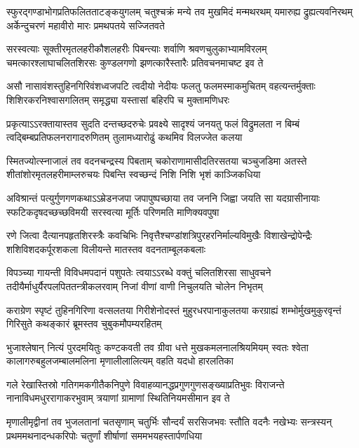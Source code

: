 \fourlineindentedshloka
{स्फुरद्गण्डाभोगप्रतिफलितताटङ्कयुगलम्}
{चतुश्चक्रं मन्ये तव मुखमिदं मन्मथरथम्}
{यमारुह्य द्रुह्यत्यवनिरथम् अर्केन्दुचरणं}
{महावीरो मारः प्रमथपतये सज्जितवते}%

\fourlineindentedshloka
{सरस्वत्याः सूक्तीरमृतलहरीकौशलहरीः}
{पिबन्त्याः शर्वाणि श्रवणचुलुकाभ्यामविरलम्}
{चमत्कारश्लाघाचलितशिरसः कुण्डलगणो}
{झणत्कारैस्तारैः प्रतिवचनमाचष्ट इव ते}%

\fourlineindentedshloka
{असौ नासावंशस्तुहिनगिरिवंशध्वजपटि}
{त्वदीयो नेदीयः फलतु फलमस्माकमुचितम्}
{वहत्यन्तर्मुक्ताः शिशिरकरनिश्वासगलितम्}
{समृद्ध्या यस्तासां बहिरपि च मुक्तामणिधरः}%

\fourlineindentedshloka
{प्रकृत्याऽऽरक्तायास्तव सुदति दन्तच्छदरुचेः}
{प्रवक्ष्ये सादृश्यं जनयतु फलं विद्रुमलता}
{न बिम्बं त्वद्बिम्बप्रतिफलनरागादरुणितम्}
{तुलामध्यारोढुं कथमिव विलज्जेत कलया}%

\fourlineindentedshloka
{स्मितज्योत्स्नाजालं तव वदनचन्द्रस्य पिबताम्}
{चकोराणामासीदतिरसतया चञ्चुजडिमा}
{अतस्ते शीतांशोरमृतलहरीमाम्लरुचयः}
{पिबन्ति स्वच्छन्दं निशि निशि भृशं काञ्जिकधिया}%

\fourlineindentedshloka
{अविश्रान्तं पत्युर्गुणगणकथाऽऽम्रेडनजपा}
{जपापुष्पच्छाया तव जननि जिह्वा जयति सा}
{यदग्रासीनायाः स्फटिकदृषदच्छच्छविमयी}
{सरस्वत्या मूर्तिः परिणमति माणिक्यवपुषा}%

\fourlineindentedshloka
{रणे जित्वा दैत्यानपहृतशिरस्त्रैः कवचिभिः}
{निवृत्तैश्चण्डांशत्रिपुरहरनिर्माल्यविमुखैः}
{विशाखेन्द्रोपेन्द्रैः शशिविशदकर्पूरशकला}
{विलीयन्ते मातस्तव वदनताम्बूलकबलाः}%

\fourlineindentedshloka
{विपञ्च्या गायन्ती विविधमपदानं पशुपतेः}
{त्वयाऽऽरब्धे वक्तुं चलितशिरसा साधुवचने}
{तदीयैर्माधुर्यैरपलपिततन्त्रीकलरवाम्}
{निजां वीणां वाणी निचुलयति चोलेन निभृतम्}%

\fourlineindentedshloka
{कराग्रेण स्पृष्टं तुहिनगिरिणा वत्सलतया}
{गिरीशेनोदस्तं मुहुरधरपानाकुलतया}
{करग्राह्यं शम्भोर्मुखमुकुरवृन्तं गिरिसुते}
{कथङ्कारं ब्रूमस्तव चुबुकमौपम्यरहितम्}%

\fourlineindentedshloka
{भुजाश्लेषान् नित्यं पुरदमयितुः कण्टकवती}
{तव ग्रीवा धत्ते मुखकमलनालश्रियमियम्}
{स्वतः श्वेता कालागरुबहुलजम्बालमलिना}
{मृणालीलालित्यम् वहति यदधो हारलतिका}%

\fourlineindentedshloka
{गले रेखास्तिस्रो गतिगमकगीतैकनिपुणे}
{विवाहव्यानद्धप्रगुणगुणसङ्ख्याप्रतिभुवः}
{विराजन्ते नानाविधमधुररागाकरभुवाम्}
{त्रयाणां ग्रामाणां स्थितिनियमसीमान इव ते}%

\fourlineindentedshloka
{मृणालीमृद्वीनां तव भुजलतानां चतसृणाम्}
{चतुर्भिः सौन्दर्यं सरसिजभवः स्तौति वदनैः}
{नखेभ्यः सन्त्रस्यन् प्रथममथनादन्धकरिपोः}
{चतुर्णां शीर्षाणां सममभयहस्तार्पणधिया}%

